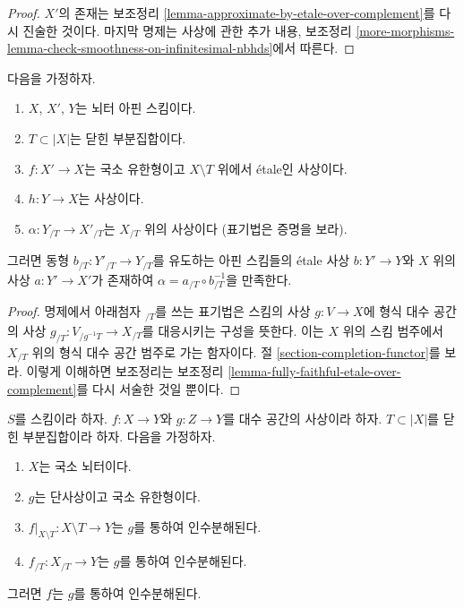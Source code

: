 \begin{proof}
$X'$의 존재는 보조정리
\ref{lemma-approximate-by-etale-over-complement}를 다시 진술한 것이다.
마지막 명제는 사상에 관한 추가 내용, 보조정리
\ref{more-morphisms-lemma-check-smoothness-on-infinitesimal-nbhds}에서
따른다.
\end{proof}

\begin{lemma}
\label{lemma-algebraize-morphism-rig-etale}
다음을 가정하자.
\begin{enumerate}
\item $X$, $X'$, $Y$는 뇌터 아핀 스킴이다.
\item $T \subset |X|$는 닫힌 부분집합이다.
\item $f : X' \to X$는 국소 유한형이고
$X \setminus T$ 위에서 \'etale인 사상이다.
\item $h : Y \to X$는 사상이다.
\item $\alpha : Y_{/T} \to X'_{/T}$는 $X_{/T}$ 위의 사상이다
(표기법은 증명을 보라).
\end{enumerate}
그러면 동형 $b_{/T} : Y'_{/T} \to Y_{/T}$를 유도하는 아핀 스킴들의
\'etale 사상 $b : Y' \to Y$와 $X$ 위의 사상
$a : Y' \to X'$가 존재하여
$\alpha = a_{/T} \circ b_{/T}^{-1}$을 만족한다.
\end{lemma}

\begin{proof}
명제에서 아래첨자 $ {}_{/T}$를 쓰는 표기법은 스킴의 사상
$g : V \to X$에 형식 대수 공간의 사상
$g_{/T} : V_{/g^{-1}T} \to X_{/T}$를 대응시키는 구성을 뜻한다.
이는 $X$ 위의 스킴 범주에서 $X_{/T}$ 위의 형식 대수 공간 범주로 가는
함자이다. 절 \ref{section-completion-functor}를 보라.
이렇게 이해하면 보조정리는 보조정리
\ref{lemma-fully-faithful-etale-over-complement}를 다시 서술한 것일 뿐이다.
\end{proof}

\begin{lemma}
\label{lemma-factor}
$S$를 스킴이라 하자. $f : X \to Y$와 $g : Z \to Y$를 대수 공간의
사상이라 하자. $T \subset |X|$를 닫힌 부분집합이라 하자.
다음을 가정하자.
\begin{enumerate}
\item $X$는 국소 뇌터이다.
\item $g$는 단사상이고 국소 유한형이다.
\item $f|_{X \setminus T} : X \setminus T \to Y$는 $g$를 통하여
인수분해된다.
\item $f_{/T} : X_{/T} \to Y$는 $g$를 통하여 인수분해된다.
\end{enumerate}
그러면 $f$는 $g$를 통하여 인수분해된다.
\end{lemma}

